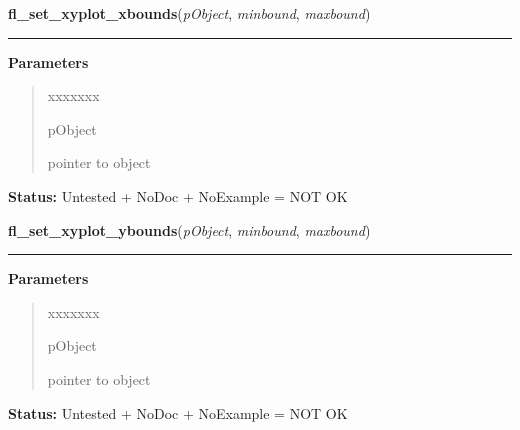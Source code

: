 \hspace{.8\funcindent}\begin{boxedminipage}{\funcwidth}

    \raggedright \textbf{fl\_set\_xyplot\_xbounds}(\textit{pObject}, \textit{minbound}, \textit{maxbound})

    \vspace{-1.5ex}

    \rule{\textwidth}{0.5\fboxrule}
\setlength{\parskip}{2ex}
\setlength{\parskip}{1ex}
      \textbf{Parameters}
      \vspace{-1ex}

      \begin{quote}
        \begin{Ventry}{xxxxxxx}

          \item[pObject]

          pointer to object

        \end{Ventry}

      \end{quote}

\textbf{Status:} Untested + NoDoc + NoExample = NOT OK



    \end{boxedminipage}

    \label{xformslib:library:fl_set_xyplot_ybounds}

    \vspace{0.5ex}

\hspace{.8\funcindent}\begin{boxedminipage}{\funcwidth}

    \raggedright \textbf{fl\_set\_xyplot\_ybounds}(\textit{pObject}, \textit{minbound}, \textit{maxbound})

    \vspace{-1.5ex}

    \rule{\textwidth}{0.5\fboxrule}
\setlength{\parskip}{2ex}
\setlength{\parskip}{1ex}
      \textbf{Parameters}
      \vspace{-1ex}

      \begin{quote}
        \begin{Ventry}{xxxxxxx}

          \item[pObject]

          pointer to object

        \end{Ventry}

      \end{quote}

\textbf{Status:} Untested + NoDoc + NoExample = NOT OK



    \end{boxedminipage}


